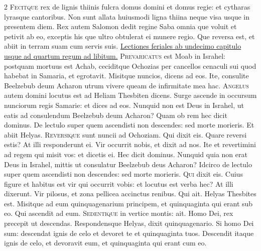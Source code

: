 \begin{multicols*}{2}
\lettrine[lines=2]{\zallmancaps \color{Red} F}{ecitque} rex de lignis thiinis fulcra domus domini et domus regie: et cytharas lyrasque cantoribus. Non sunt allata huiusmodi ligna thiina neque visa usque in presentem diem. Rex autem Salomon dedit regine Saba omnia que voluit et petivit ab eo, exceptis his que ultro obtulerat ei munere regio. Que reversa est, et abiit in terram suam cum servis suis.
\newline \ul{Lectiones feriales ab undecimo capitulo usque ad quartum regum ad libitum.}
{\color{Red} }
\lettrine[lines=2]{\zallmancaps \color{Blue} P}{revaricatus} est Moab in Israhel: postquam mortuus est Achab, ceciditque Ochozias per cancellos cenaculi sui quod habebat in Samaria, et egrotavit. Misitque nuncios, dicens ad eos. Ite, consulite Beelzebub deum Acharon utrum vivere queam de infirmitate mea hac.%
\lettrine[lines=2]{\zallmancaps \color{Red} A}{ngelus} autem domini locutus est ad Heliam Thesbiten dicens. Surge ascende in occursum nunciorum regis Samarie: et dices ad eos. Nunquid non est Deus in Israhel, ut eatis ad consulendum Beelzebub deum Acharon? Quam ob rem hec dicit dominus. De lectulo super quem ascendisti non descendes: sed morte morieris. Et abiit Helyas.
\lettrine[lines=2]{\zallmancaps \color{Blue} R}{eversique} sunt nuncii ad Ochoziam. Qui dixit eis. Quare reversi estis? At illi responderunt ei. Vir occurrit nobis, et dixit ad nos. Ite et revertimini ad regem qui misit vos: et dicetis ei. Hec dicit dominus. Nunquid quia non erat Deus in Israhel, mittis ut consulatur Beelzebub deus Acharon? Idcirco de lectulo super quem ascendisti non descendes: sed morte morieris.
\lettrine[lines=2]{\zallmancaps \color{Red} Q}{ui} dixit eis. Cuius figure et habitus est vir qui occurrit vobis: et locutus est verba hec? At illi dixerunt. Vir pilosus, et zona pellicea accinctus renibus. Qui ait. Helyas Thesbites est. Misitque ad eum quinquagenarium principem, et quinquaginta qui erant sub eo. Qui ascendit ad eum.
\lettrine[lines=2]{\zallmancaps \color{Blue} S}{edentique} in vertice montis: ait. Homo Dei, rex precepit ut descendas. Respondensque Helyas, dixit quinquagenario. Si homo Dei sum: descendat ignis de celo et devoret te et quinquaginta tuos. Descendit itaque ignis de celo, et devoravit eum, et quinquaginta qui erant cum eo.

\end{multicols*}
